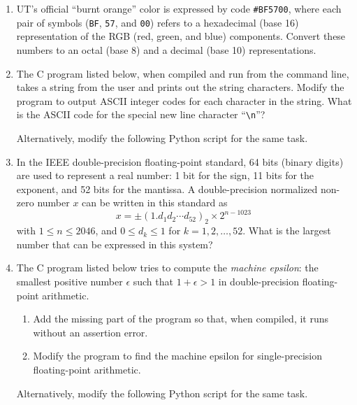 \begin{enumerate}

\item UT's official ``burnt orange'' color is expressed by code
  \texttt{\#BF5700}, where each pair of symbols (\texttt{BF},
  \texttt{57}, and \texttt{00}) refers to a hexadecimal (base 16)
  representation of the RGB (red, green, and blue) components. Convert these
  numbers to an octal (base 8) and a decimal (base 10) representations.

\item The C program listed below, when compiled and
  run from the command line, takes a string from the user and prints
  out the string characters. Modify the program to output ASCII
  integer codes for each character in the string. What is the ASCII
  code for the special new line character ``\verb+\n+''?

\lstset{language=c,numbers=left,numberstyle=\tiny,showstringspaces=false}


Alternatively, modify the following Python script for the same task.

\lstset{language=python,numbers=left,numberstyle=\tiny,showstringspaces=false}


\item In the IEEE double-precision floating-point standard, 64 bits
  (binary digits) are used to represent a real number: 1 bit for the
  sign, 11 bits for the exponent, and 52 bits for the mantissa. A
  double-precision normalized non-zero number $x$ can be written in
  this standard as 
  \[
  x = \pm (1.d_1d_2{\cdots}d_{52})_2 \times 2^{n-1023}\,
  \]
  with $1 \le n \le 2046$, and $0 \le d_k \le 1$ for
  $k=1,2,\ldots,52$. What is the largest number that can be expressed
  in this system?

\item The C program listed below tries to compute the \emph{machine
    epsilon}: the smallest positive number $\epsilon$ such that
  $1+\epsilon > 1$ in double-precision floating-point arithmetic. 

\begin{enumerate}
\item Add the missing part of the program so that, when compiled, it
  runs without an assertion error.
\item Modify the program to find the machine epsilon for single-precision floating-point arithmetic.
\end{enumerate}

\lstset{language=c,numbers=left,numberstyle=\tiny,showstringspaces=false}


Alternatively, modify the following Python script for the same task.

\lstset{language=python,numbers=left,numberstyle=\tiny,showstringspaces=false}


\end{enumerate}



